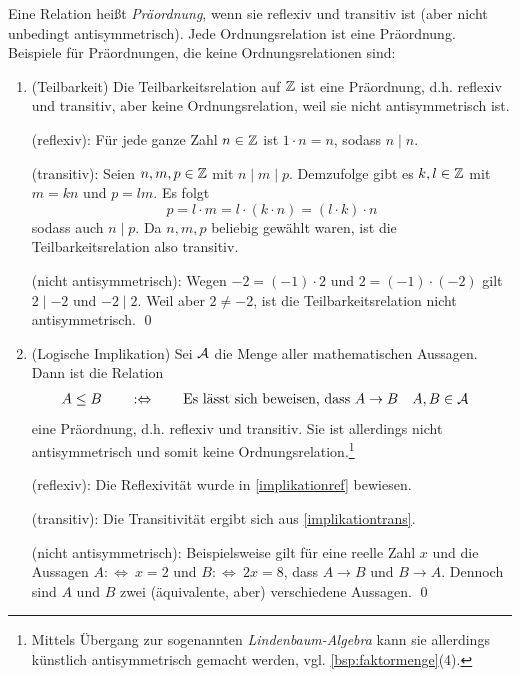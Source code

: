 \begin{bsp}[Präordnungen] 
    Eine Relation heißt \emph{Präordnung}, wenn sie reflexiv und transitiv ist (aber nicht unbedingt antisymmetrisch). Jede Ordnungsrelation ist eine Präordnung. Beispiele für Präordnungen, die keine Ordnungsrelationen sind:
    \begin{enumerate}
        \item(Teilbarkeit) Die Teilbarkeitsrelation auf $\mathbb Z$ ist eine Präordnung, d.h. reflexiv und transitiv, aber keine Ordnungsrelation, weil sie nicht antisymmetrisch ist.
        \begin{bew}
            (reflexiv): Für jede ganze Zahl $n\in \mathbb Z$ ist $1\cdot n=n$, sodass $n\mid n$.

            (transitiv): Seien $n,m,p\in \mathbb Z$ mit $n\mid m\mid p$. Demzufolge gibt es $k,l\in \mathbb Z$ mit $m=kn$ und $p=lm$. Es folgt
                \[ p = l\cdot m = l\cdot (k\cdot n) = (l\cdot k)\cdot n \]
            sodass auch $n\mid p$. Da $n,m,p$ beliebig gewählt waren, ist die Teilbarkeitsrelation also transitiv.

            (nicht antisymmetrisch): Wegen $-2=(-1)\cdot 2$ und $2=(-1)\cdot (-2)$ gilt $2\mid -2$ und $-2\mid 2$. Weil aber $2\neq -2$, ist die Teilbarkeitsrelation nicht antisymmetrisch. \qed
        \end{bew}
        \item(Logische Implikation) Sei $\mathcal A$ die Menge aller mathematischen Aussagen. Dann ist die Relation
        \begin{align*}
            A\le B \qquad &:\Leftrightarrow\qquad  \text{Es lässt sich beweisen, dass $A\to B$} && A,B\in \mathcal A
        \end{align*}
        eine Präordnung, d.h. reflexiv und transitiv. Sie ist allerdings nicht antisymmetrisch und somit keine Ordnungsrelation.\footnote{Mittels Übergang zur sogenannten \emph{Lindenbaum-Algebra} kann sie allerdings künstlich antisymmetrisch gemacht werden, vgl. \cref{bsp:faktormenge}(4).}
        \begin{bew}
            (reflexiv): Die Reflexivität wurde in \cref{implikationref} bewiesen.

            (transitiv): Die Transitivität ergibt sich aus \cref{implikationtrans}.

            (nicht antisymmetrisch): Beispielsweise gilt für eine reelle Zahl $x$ und die Aussagen $A:\Leftrightarrow\ x=2$ und $B:\Leftrightarrow\ 2x=8$, dass $A\to B$ und $B\to A$. Dennoch sind $A$ und $B$ zwei (äquivalente, aber) verschiedene Aussagen. \qed
        \end{bew}
    \end{enumerate}
\end{bsp}


